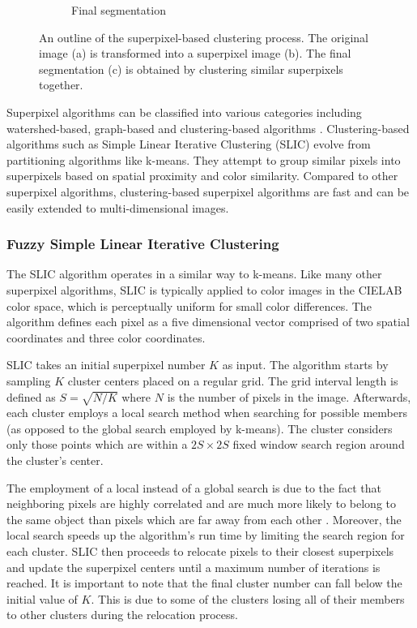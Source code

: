 \begin{figure}[htbp]
\begin{subfigure}[b]{0.3\textwidth}
         \caption{Final segmentation}
     \end{subfigure}
    \caption{An outline of the superpixel-based clustering process. The original image (a) is transformed into a superpixel image (b). The final segmentation (c) is obtained by clustering similar superpixels together.}
    \label{fig:sp_based_clustering_process}
\end{figure}

Superpixel algorithms can be classified into various categories including watershed-based, graph-based and clustering-based algorithms \parencite{stutz2018superpixels}. Clustering-based algorithms such as Simple Linear Iterative Clustering (SLIC) \parencite{achanta2010slic} evolve from partitioning algorithms like k-means. They attempt to group similar pixels into superpixels based on spatial proximity and color similarity. Compared to other superpixel algorithms, clustering-based superpixel algorithms are fast and can be easily extended to multi-dimensional images.

\subsubsection{Fuzzy Simple Linear Iterative Clustering}

The SLIC algorithm \parencite{achanta2012slic} operates in a similar way to k-means. Like many other superpixel algorithms, SLIC is typically applied to color images in the CIELAB color space, which is perceptually uniform for small color differences. The algorithm defines each pixel as a five dimensional vector comprised of two spatial coordinates and three color coordinates.

SLIC takes an initial superpixel number $K$ as input. The algorithm starts by sampling $K$ cluster centers placed on a regular grid. The grid interval length is defined as $S=\sqrt{{N}/{K}}$ where $N$ is the number of pixels in the image.
Afterwards, each cluster employs a local search method when searching for possible members (as opposed to the global search employed by k-means). The cluster considers only those points which are within a $2S \times 2S$ fixed window search region around the cluster's center.

The employment of a local instead of a global search is due to the fact that neighboring pixels are highly correlated and are much more likely to belong to the same object than pixels which are far away from each other \parencite{achanta2012slic}. Moreover, the local search speeds up the algorithm's run time by limiting the search region for each cluster. SLIC then proceeds to relocate pixels to their closest superpixels and update the superpixel centers until a maximum number of iterations is reached. It is important to note that the final cluster number can fall below the initial value of $K$. This is due to some of the clusters losing all of their members to other clusters during the relocation process.


